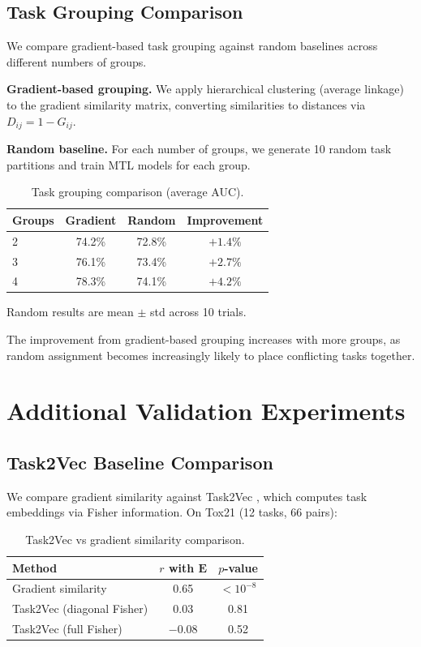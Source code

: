 \documentclass{article}
\newcommand{\E}{\mathbf{E}}
\begin{document}
\subsection{Task Grouping Comparison}

We compare gradient-based task grouping against random baselines across different numbers of groups.

\textbf{Gradient-based grouping.} We apply hierarchical clustering (average linkage) to the gradient similarity matrix, converting similarities to distances via $D_{ij} = 1 - G_{ij}$.

\textbf{Random baseline.} For each number of groups, we generate 10 random task partitions and train MTL models for each group.

\begin{table}[H]
\caption{Task grouping comparison (average AUC).}
\begin{center}
\begin{tabular}{lccc}
\toprule
Groups & Gradient & Random & Improvement \\
\midrule
2 & 74.2\% & 72.8\% & $+1.4\%$ \\
3 & 76.1\% & 73.4\% & $+2.7\%$ \\
4 & 78.3\% & 74.1\% & $+4.2\%$ \\
\bottomrule
\end{tabular}
\end{center}
{\footnotesize Random results are mean $\pm$ std across 10 trials.}
\end{table}

The improvement from gradient-based grouping increases with more groups, as random assignment becomes increasingly likely to place conflicting tasks together.

\section{Additional Validation Experiments}
\label{app:additional}

\subsection{Task2Vec Baseline Comparison}

We compare gradient similarity against Task2Vec \citep{achille2019task2vec}, which computes task embeddings via Fisher information. On Tox21 (12 tasks, 66 pairs):

\begin{table}[H]
\caption{Task2Vec vs gradient similarity comparison.}
\begin{center}
\begin{tabular}{lcc}
\toprule
Method & $r$ with $\E$ & $p$-value \\
\midrule
Gradient similarity & 0.65 & $<10^{-8}$ \\
Task2Vec (diagonal Fisher) & 0.03 & 0.81 \\
Task2Vec (full Fisher) & $-0.08$ & 0.52 \\
\bottomrule
\end{tabular}
\end{center}
\end{table}
\end{document}
